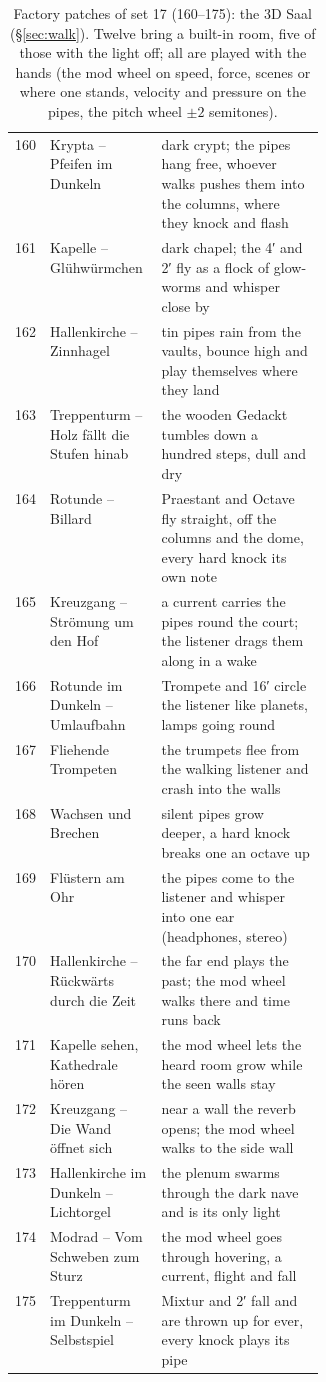 \documentclass[11pt,a4paper,parskip=half,DIV=11,toc=bibliography]{scrartcl}
\begin{document}
\begin{table}[ht]
\centering\footnotesize
\begin{tabularx}{\linewidth}{@{}r>{\raggedright\arraybackslash}p{0.36\linewidth}>{\raggedright\arraybackslash}X@{}}
\toprule
160 & Krypta – Pfeifen im Dunkeln & dark crypt; the pipes hang free, whoever walks pushes them into the columns, where they knock and flash \\
161 & Kapelle – Glühwürmchen & dark chapel; the 4′ and 2′ fly as a flock of glow-worms and whisper close by \\
162 & Hallenkirche – Zinnhagel & tin pipes rain from the vaults, bounce high and play themselves where they land \\
163 & Treppenturm – Holz fällt die Stufen hinab & the wooden Gedackt tumbles down a hundred steps, dull and dry \\
164 & Rotunde – Billard & Praestant and Octave fly straight, off the columns and the dome, every hard knock its own note \\
165 & Kreuzgang – Strömung um den Hof & a current carries the pipes round the court; the listener drags them along in a wake \\
166 & Rotunde im Dunkeln – Umlaufbahn & Trompete and 16′ circle the listener like planets, lamps going round \\
167 & Fliehende Trompeten & the trumpets flee from the walking listener and crash into the walls \\
168 & Wachsen und Brechen & silent pipes grow deeper, a hard knock breaks one an octave up \\
169 & Flüstern am Ohr & the pipes come to the listener and whisper into one ear (headphones, stereo) \\
170 & Hallenkirche – Rückwärts durch die Zeit & the far end plays the past; the mod wheel walks there and time runs back \\
171 & Kapelle sehen, Kathedrale hören & the mod wheel lets the heard room grow while the seen walls stay \\
172 & Kreuzgang – Die Wand öffnet sich & near a wall the reverb opens; the mod wheel walks to the side wall \\
173 & Hallenkirche im Dunkeln – Lichtorgel & the plenum swarms through the dark nave and is its only light \\
174 & Modrad – Vom Schweben zum Sturz & the mod wheel goes through hovering, a current, flight and fall \\
175 & Treppenturm im Dunkeln – Selbstspiel & Mixtur and 2′ fall and are thrown up for ever, every knock plays its pipe \\
\bottomrule
\end{tabularx}
\caption{Factory patches of set 17 (160--175): the 3D Saal (\S\ref{sec:walk}). Twelve bring a built-in room, five of those with the light off; all are
played with the hands (the mod wheel on speed, force, scenes or where one stands, velocity and pressure on the pipes, the pitch wheel $\pm2$
semitones).}
\label{tab:patches4}
\end{table}
\end{document}
